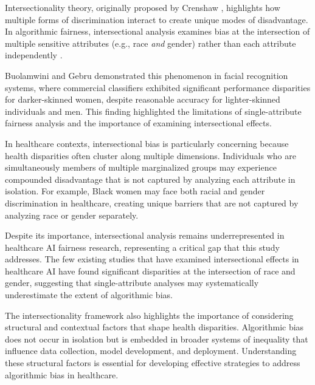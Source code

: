 Intersectionality theory, originally proposed by Crenshaw \cite{crenshaw1989}, 
highlights how multiple forms of discrimination interact to create unique 
modes of disadvantage. In algorithmic fairness, intersectional analysis 
examines bias at the intersection of multiple sensitive attributes (e.g., 
race \textit{and} gender) rather than each attribute independently 
\cite{buolamwini2018}.

Buolamwini and Gebru \cite{buolamwini2018} demonstrated this phenomenon 
in facial recognition systems, where commercial classifiers exhibited 
significant performance disparities for darker-skinned women, despite 
reasonable accuracy for lighter-skinned individuals and men. This finding 
highlighted the limitations of single-attribute fairness analysis and the 
importance of examining intersectional effects.

In healthcare contexts, intersectional bias is particularly concerning 
because health disparities often cluster along multiple dimensions. 
Individuals who are simultaneously members of multiple marginalized groups 
may experience compounded disadvantage that is not captured by analyzing 
each attribute in isolation. For example, Black women may face both racial 
and gender discrimination in healthcare, creating unique barriers that 
are not captured by analyzing race or gender separately.

Despite its importance, intersectional analysis remains underrepresented 
in healthcare AI fairness research, representing a critical gap that this 
study addresses. The few existing studies that have examined intersectional 
effects in healthcare AI have found significant disparities at the 
intersection of race and gender, suggesting that single-attribute analyses 
may systematically underestimate the extent of algorithmic bias.

The intersectionality framework also highlights the importance of 
considering structural and contextual factors that shape health disparities. 
Algorithmic bias does not occur in isolation but is embedded in broader 
systems of inequality that influence data collection, model development, 
and deployment. Understanding these structural factors is essential for 
developing effective strategies to address algorithmic bias in healthcare.

